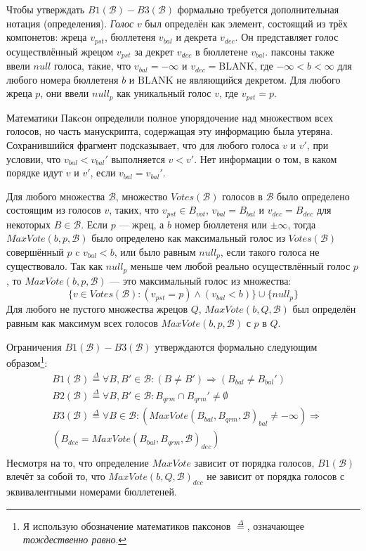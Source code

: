 \documentclass[12pt, a4paper]{article} %
\begin{document}
Чтобы утверждать $B1(\mathcal{B}) - B3(\mathcal{B})$ формально требуется дополнительная нотация (определения). \textit{Голос} $v$ был определён как элемент, состоящий из трёх компонетов: жреца $v_{pst}$, бюллетеня $v_{bal}$ и декрета $v_{dec}$. Он представляет голос осуществлённый жрецом $v_{pst}$ за декрет $v_{dec}$ в бюллетене $v_{bal}$. паксоны также ввели $null$ голоса, такие, что $v_{bal}=-\infty$ и $v_{dec}=\mathrm{BLANK}$, где $-\infty < b < \infty$ для любого номера бюллетеня $b$ и $\mathrm{BLANK}$ не являющийся декретом. Для любого жреца $p$, они ввели $null_p$ как уникальный голос $v$, где $v_{pst}=p$.

Математики Пакcон определили полное упорядочение над множеством всех голосов, но часть манускрипта, содержащая эту информацию была утеряна. Сохранившийся фрагмент подсказывает, что для любого голоса $v$ и $v'$, при условии, что $v_{bal} < v_{bal}'$ выполняется $v < v'$. Нет информации о том, в каком порядке идут $v$ и $v'$, если $v_{bal} = v_{bal}'$.

Для любого множества $\mathcal{B}$, множество $Votes(\mathcal{B})$ голосов в $\mathcal{B}$ было определено состоящим из голосов $v$, таких, что $v_{pst} \in B_{vot}$, $v_{bal} = B_{bal}$ и $v_{dec} = B_{dec}$ для некоторых $B \in \mathcal{B}$. Если $p$ --- жрец, а $b$ номер бюллетеня или $\pm \infty$, тогда $MaxVote(b, p, \mathcal{B})$ было определено как максимальный голос из $Votes(\mathcal{B})$ совершённый $p$ c $v_{bal} < b$, или было равным $null_p$, если такого голоса не существовало. Так как $null_p$ меньше чем любой реально осуществлённый голос $p$, то $MaxVote(b,p, \mathcal{B})$ --- это максимальный голос из множества:
\[  
    \{v \in Votes(\mathcal{B}) : (v_{pst} = p) \land (v_{bal} < b)\} \cup \{null_p\}
\]
Для любого не пустого множества жрецов $Q$, $MaxVote(b, Q, \mathcal{B})$ был определён равным как максимум всех голосов $MaxVote(b, p, \mathcal{B})$ с $p$ в $Q$.

Ограничения  $B1(\mathcal{B}) - B3(\mathcal{B})$ утверждаются формально следующим образом\footnote{Я использую обозначение математиков паксонов $\overset{\Delta}{=}$, означающее \textit{тождественно равно}.}:
\begin{align*}
    &B1(\mathcal{B}) \overset{\Delta}{=} \forall B, B' \in \mathcal{B} : (B \neq B') \Rightarrow (B_{bal} \neq B_{bal}') \\
    &B2(\mathcal{B}) \overset{\Delta}{=} \forall B, B' \in \mathcal{B} : B_{qrm} \cap B_{qrm}' \neq \emptyset \\
    &B3(\mathcal{B}) \overset{\Delta}{=} \forall B \in \mathcal{B} : (MaxVote(B_{bal}, B_{qrm}, \mathcal{B})_{bal} \neq - \infty) \Rightarrow \\
    &(B_{dec} = MaxVote(B_{bal}, B_{qrm}, \mathcal{B})_{dec}) \\
\end{align*}
Несмотря на то, что определение $MaxVote$ зависит от порядка голосов, $B1(\mathcal{B})$ влечёт за собой то, что $MaxVote(b, Q, \mathcal{B})_{dec}$ не зависит от порядка голосов с эквивалентными номерами бюллетеней.
\end{document}
